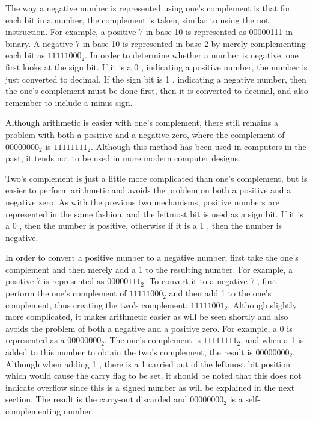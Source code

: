 \documentclass[10pt]{book}
\begin{document}
The way a negative number is represented using one's complement is that for each bit in a number, the complement is taken, similar to using the not instruction. For example, a positive 7 in base 10 is represented as 00000111 in binary. A negative 7 in base 10 is represented in base 2 by merely complementing each bit as $11111000_{2}$. In order to determine whether a number is negative, one first looks at the sign bit. If it is a 0 , indicating a positive number, the number is just converted to decimal. If the sign bit is 1 , indicating a negative number, then the one's complement must be done first, then it is converted to decimal, and also remember to include a minus sign.

Although arithmetic is easier with one's complement, there still remains a problem with both a positive and a negative zero, where the complement of $00000000_{2}$ is $11111111_{2}$. Although this method has been used in computers in the past, it tends not to be used in more modern computer designs.

Two's complement is just a little more complicated than one's complement, but is easier to perform arithmetic and avoids the problem on both a positive and a negative zero. As with the previous two mechanisms, positive numbers are represented in the same fashion, and the leftmost bit is used as a sign bit. If it is a 0 , then the number is positive, otherwise if it is a 1 , then the number is negative.

In order to convert a positive number to a negative number, first take the one's complement and then merely add a 1 to the resulting number. For example, a positive 7 is represented as $00000111_{2}$. To convert it to a negative 7 , first perform the one's complement of $11111000_{2}$ and then add 1 to the one's complement, thus creating the two's complement: $11111001_{2}$. Although slightly more complicated, it makes arithmetic easier as will be seen shortly and also avoids the problem of both a negative and a positive zero. For example, a 0 is represented as a $00000000_{2}$. The one's complement is $11111111_{2}$, and when a 1 is added to this number to obtain the two's complement, the result is $00000000_{2}$. Although when adding 1 , there is a 1 carried out of the leftmost bit position which would cause the carry flag to be set, it should be noted that this does not indicate overflow since this is a signed number as will be explained in the next section. The result is the carry-out discarded and $00000000_{2}$ is a self-complementing number.
\end{document}

